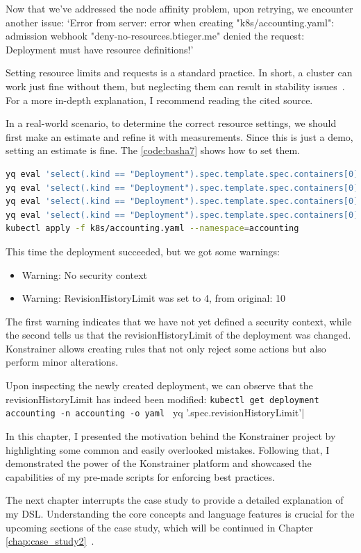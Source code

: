 Now that we've addressed the node affinity problem, upon retrying, we encounter another issue: `Error from server: error when creating "k8s/accounting.yaml": admission webhook "deny-no-resources.btieger.me" denied the request: Deployment must have resource definitions!'

Setting resource limits and requests is a standard practice. In short, a cluster can work just fine without them, but neglecting them can result in stability issues~\cite{ResourcesGood}. For a more in-depth explanation, I recommend reading the cited source.

In a real-world scenario, to determine the correct resource settings, we should first make an estimate and refine it with measurements. Since this is just a demo, setting an estimate is fine. The \ref{code:basha7} shows how to set them.

\begin{lstlisting}[caption={Setting resources and redeploy the Accounting module},language=bash,label=code:basha7]
yq eval 'select(.kind == "Deployment").spec.template.spec.containers[0].resources.limits.cpu = "500m"' k8s/accounting.yaml -i
yq eval 'select(.kind == "Deployment").spec.template.spec.containers[0].resources.limits.memory = "128Mi"' k8s/accounting.yaml -i
yq eval 'select(.kind == "Deployment").spec.template.spec.containers[0].resources.requests.cpu = "500m"' k8s/accounting.yaml -i
yq eval 'select(.kind == "Deployment").spec.template.spec.containers[0].resources.requests.memory = "128Mi"' k8s/accounting.yaml -i
kubectl apply -f k8s/accounting.yaml --namespace=accounting
\end{lstlisting}

This time the deployment succeeded, but we got some warnings:

\begin{itemize}
  \item Warning: No security context
  \item Warning: RevisionHistoryLimit was set to 4, from original: 10
\end{itemize}

The first warning indicates that we have not yet defined a security context, while the second tells us that the revisionHistoryLimit of the deployment was changed. Konstrainer allows creating rules that not only reject some actions but also perform minor alterations.

Upon inspecting the newly created deployment, we can observe that the revisionHistoryLimit has indeed been modified:
\lstinline|kubectl get deployment accounting -n accounting -o yaml | yq '.spec.revisionHistoryLimit'|

In this chapter, I presented the motivation behind the Konstrainer project by highlighting some common and easily overlooked mistakes. Following that, I demonstrated the power of the Konstrainer platform and showcased the capabilities of my pre-made scripts for enforcing best practices. 

The next chapter interrupts the case study to provide a detailed explanation of my DSL. Understanding the core concepts and language features is crucial for the upcoming sections of the case study, which will be continued in Chapter \ref{chap:case_study2}~.
